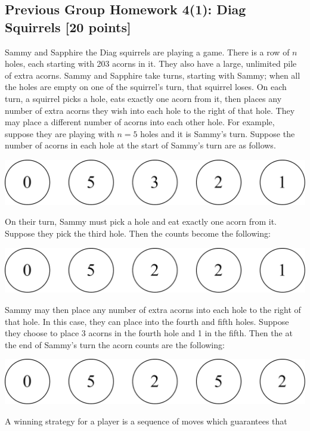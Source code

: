 \documentclass[12pt]{exam}
\begin{document}
\subsection*{Previous Group Homework 4(1): Diag Squirrels [20 points]}
Sammy and Sapphire the Diag squirrels are playing a game.
There is a row of $n$ holes, each starting with 203 acorns in it.
They also have a large, unlimited pile of extra acorns.
Sammy and Sapphire take turns, starting with Sammy; when all the holes are empty on
one of the
squirrel's turn, that squirrel loses. On each turn, a squirrel picks a hole,
eats exactly one acorn from it, then places any number of extra acorns they wish
into each hole to the right of that hole.
They may place a different number of acorns into each other hole.
For example, suppose they are playing with $n = 5$ holes and it is Sammy's turn.
Suppose the number of acorns in each hole at the start of Sammy's turn are as
follows.
\begin{center}
\includegraphics[scale=0.25]{holes1.png}
\end{center}
On their turn, Sammy must pick a hole and eat exactly one acorn from it. Suppose
they pick the third hole. Then the counts become the following:
\begin{center}
\includegraphics[scale=0.25]{holes2.png}
\end{center}
Sammy may then place any number of extra acorns into each hole to the right of that
hole. In this case, they can place into the fourth and fifth holes. Suppose they
choose to place 3 acorns in the fourth hole and 1 in the fifth. Then the at the end
of Sammy's turn the acorn counts are the following:
\begin{center}
\includegraphics[scale=0.25]{holes3.png}
\end{center}
A winning strategy for a player is a sequence of moves which guarantees that
\end{document}
